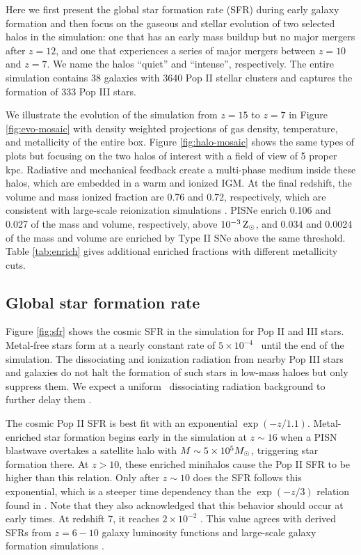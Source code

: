 \documentclass[apjl]{emulateapj}
\begin{document}
Here we first present the global star formation rate (SFR) during
early galaxy formation and then focus on the gaseous and stellar
evolution of two selected halos in the simulation: one that has an
early mass buildup but no major mergers after $z=12$, and one that
experiences a series of major mergers between $z=10$ and $z=7$.  We
name the halos ``quiet'' and ``intense'', respectively.  The entire
simulation contains 38 galaxies with 3640 Pop II stellar clusters and
captures the formation of 333 Pop III stars.

We illustrate the evolution of the simulation from $z=15$ to $z=7$ in
Figure \ref{fig:evo-mosaic} with density weighted projections of gas
density, temperature, and metallicity of the entire box.  Figure
\ref{fig:halo-mosaic} shows the same types of plots but focusing on
the two halos of interest with a field of view of 5 proper kpc.
Radiative and mechanical feedback create a multi-phase medium inside
these halos, which are embedded in a warm and ionized IGM.  At the
final redshift, the volume and mass ionized fraction are 0.76 and
0.72, respectively, which are consistent with large-scale reionization
simulations \citep{Zahn11}.  PISNe enrich 0.106 and 0.027 of the mass
and volume, respectively, above $10^{-3} {\rm\,Z_\odot}$, and 0.034 and 0.0024
of the mass and volume are enriched by Type II SNe above the same
threshold.  Table \ref{tab:enrich} gives additional enriched fractions
with different metallicity cuts.

\subsection{Global star formation rate}

Figure \ref{fig:sfr} shows the cosmic SFR in the simulation for Pop II
and III stars.  Metal-free stars form at a nearly constant rate of $5
\times 10^{-4}$ \sfr~until the end of the simulation.  The
dissociating and ionization radiation from nearby Pop III stars and
galaxies do not halt the formation of such stars in low-mass haloes
but only suppress them.  We expect a uniform \hh~dissociating
radiation background to further delay them \citep{Machacek01, Wise07,
  OShea08}.

The cosmic Pop II SFR is best fit with an exponential $\exp(-z/1.1)$.
Metal-enriched star formation begins early in the simulation at $z
\sim 16$ when a PISN blastwave overtakes a satellite halo with $M \sim
5 \times 10^5 \Ms$, triggering star formation there.  At $z>10$, these
enriched minihalos cause the Pop II SFR to be higher than this
relation.  Only after $z \sim 10$ does the SFR follows this
exponential, which is a steeper time dependency than the $\exp(-z/3)$
relation found in \citet{Hernquist03}.  Note that they also
acknowledged that this behavior should occur at early times.  At
redshift 7, it reaches $2 \times 10^{-2}$ \sfr.  This value agrees
with derived SFRs from $z=6-10$ galaxy luminosity functions
\citep[e.g.][]{Bouwens10} and large-scale galaxy formation simulations
\citep[e.g.][]{Schaye10}.
\end{document}
